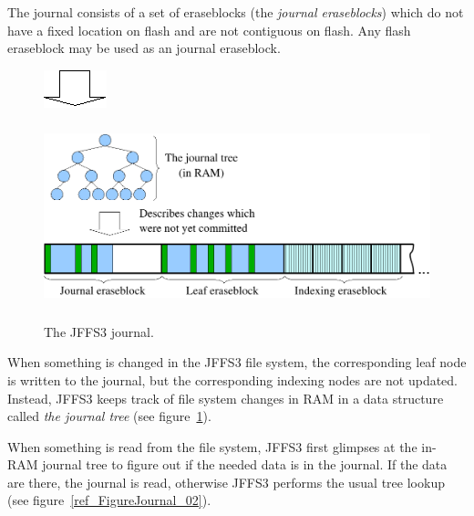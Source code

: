 The journal consists of a set of eraseblocks (the \emph{journal eraseblocks})
which do not have a fixed location on flash and are not contiguous on flash.
Any flash eraseblock may be used as an journal eraseblock.

%
%
\begin{figure}[h]
\begin{center}
\begin{htmlonly}
\includegraphics{pics/journal-01.png}
\end{htmlonly}
\includegraphics[width=159mm,height=60mm]{pics/journal-01.pdf}
\end{center}
\caption{The JFFS3 journal.}
\label{ref_FigureJournal_01}
\end{figure}

When something is changed in the JFFS3 file system, the corresponding leaf node
is written to the journal, but the corresponding indexing nodes are not
updated. Instead, JFFS3 keeps track of file system changes in RAM in a data
structure called \emph{the journal tree} (see
figure~\ref{ref_FigureJournal_01}).

When something is read from the file system, JFFS3 first glimpses at the
\mbox{in-RAM} journal tree to figure out if the needed data is in the journal.
If the data are there, the journal is read, otherwise JFFS3 performs the usual
tree lookup (see figure~\ref{ref_FigureJournal_02}).

